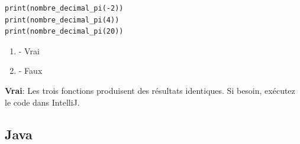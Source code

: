 \begin{Exercice}[5 minutes]
\begin{lstlisting}
print(nombre_decimal_pi(-2))
print(nombre_decimal_pi(4))
print(nombre_decimal_pi(20))
\end{lstlisting}











    



\begin{enumerate}
    \item - Vrai
    \item - Faux
\end{enumerate}
\begin{solution}
    \textbf{Vrai}: Les trois fonctions produisent des résultats identiques. Si besoin, exécutez le code dans IntelliJ.
\end{solution}
\end{Exercice}
\subsection{Java}


